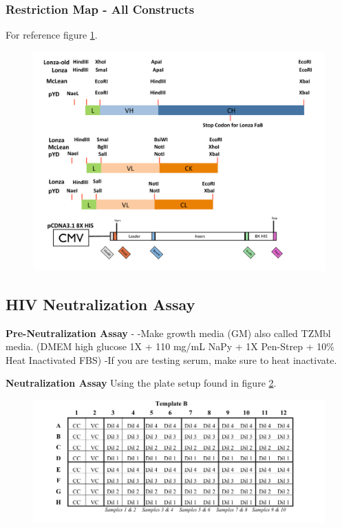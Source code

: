 \subsubsection{Restriction Map - All Constructs}
For reference figure \ref{fig:figa_1}.

\begin{figure}
   \centering
   \includegraphics[scale=.85]{images/appendix/figa1.pdf}
   \caption[Restriction Maps for Common Vectors]{}
       \label{fig:figa_1}
\end{figure}

\clearpage

\subsection{HIV Neutralization Assay}
\textbf{Pre-Neutralization Assay} -
-Make growth media (GM) also called TZMbl media. (DMEM high glucose 1X + 110 mg/mL NaPy + 1X Pen-Strep +  10\% Heat Inactivated FBS)
-If you are testing serum, make sure to heat inactivate.

\textbf{Neutralization Assay}
Using the plate setup found in figure \ref{fig:figa_2}.
\begin{figure}[!t]
   \centering
   \includegraphics[]{images/appendix/figa2.png}
   \caption[Neutralization Assay Plate Setup]{}
       \label{fig:figa_2}
\end{figure}

